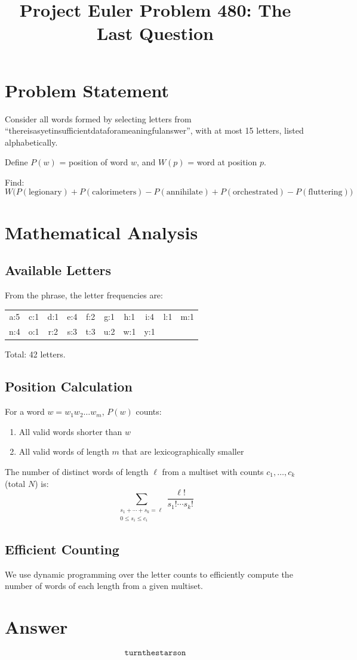 \documentclass[12pt]{article}
\title{Project Euler Problem 480: The Last Question}
\author{}
\date{}
\begin{document}
\maketitle

\section{Problem Statement}
Consider all words formed by selecting letters from ``thereisasyetinsufficientdataforameaningfulanswer'', with at most 15 letters, listed alphabetically.

Define $P(w)$ = position of word $w$, and $W(p)$ = word at position $p$.

Find:
\[
W\bigl(P(\text{legionary}) + P(\text{calorimeters}) - P(\text{annihilate}) + P(\text{orchestrated}) - P(\text{fluttering})\bigr)
\]

\section{Mathematical Analysis}

\subsection{Available Letters}
From the phrase, the letter frequencies are:
\begin{center}
\begin{tabular}{cccccccccc}
a:5 & c:1 & d:1 & e:4 & f:2 & g:1 & h:1 & i:4 & l:1 & m:1 \\
n:4 & o:1 & r:2 & s:3 & t:3 & u:2 & w:1 & y:1 & &
\end{tabular}
\end{center}
Total: 42 letters.

\subsection{Position Calculation}
For a word $w = w_1 w_2 \ldots w_m$, $P(w)$ counts:
\begin{enumerate}
    \item All valid words shorter than $w$
    \item All valid words of length $m$ that are lexicographically smaller
\end{enumerate}

The number of distinct words of length $\ell$ from a multiset with counts $c_1, \ldots, c_k$ (total $N$) is:
\[
\sum_{\substack{s_1+\cdots+s_k = \ell \\ 0 \le s_i \le c_i}} \frac{\ell!}{s_1! \cdots s_k!}
\]

\subsection{Efficient Counting}
We use dynamic programming over the letter counts to efficiently compute the number of words of each length from a given multiset.

\section{Answer}

\[
\boxed{\texttt{turnthestarson}}
\]
\end{document}
